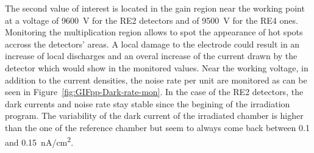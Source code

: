 	The second value of interest is located in the gain region near the working point at a voltage of \SI{9600}{V} for the RE2 detectors and of \SI{9500}{V} for the RE4 ones. Monitoring the multiplication region allows to spot the appearance of hot spots accross the detectors' areas. A local damage to the electrode could result in an increase of local discharges and an overal increase of the current drawn by the detector which would show in the monitored values. Near the working voltage, in addition to the current densities, the noise rate per unit are monitored as can be seen in Figure~\ref{fig:GIFpp-Dark-rate-mon}. In the case of the RE2 detectors, the dark currents and noise rate stay stable since the begining of the irradiation program. The variability of the dark current of the irradiated chamber is higher than the one of the reference chamber but seem to always come back between 0.1 and \SI{0.15}{nA/cm^2}.

